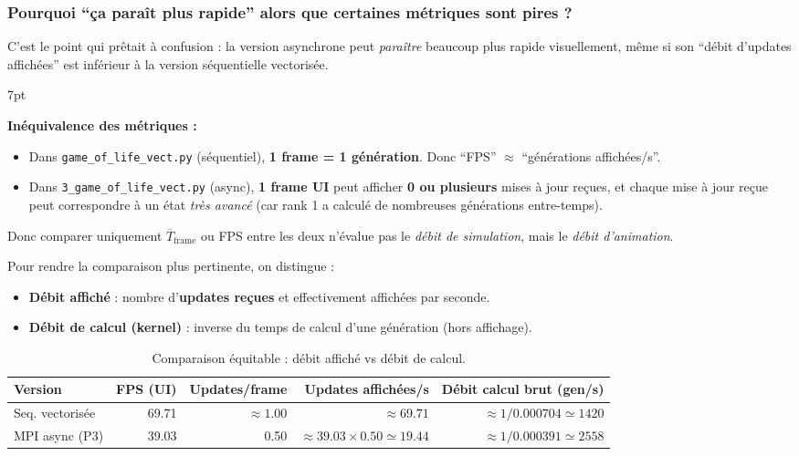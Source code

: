 \documentclass[11pt,a4paper]{article}
\newenvironment{formal}{%
\def\FrameCommand{%
  \hspace{1pt}%
  {\color{enstaBleuFonce}\vrule width 2pt}%
  {\color{formalshade}\vrule width 4pt}%
  \colorbox{formalshade}%
}%
\MakeFramed{\advance\hsize-\width\FrameRestore}%
\noindent\hspace{-4.55pt}%
\begin{adjustwidth}{}{7pt}%
\vspace{4pt}%
}{%
\vspace{4pt}\end{adjustwidth}\endMakeFramed%
}
\begin{document}
\subsubsection{Pourquoi ``ça paraît plus rapide'' alors que certaines métriques sont pires ?}

C’est le point qui prêtait à confusion : la version asynchrone peut \emph{paraître} beaucoup plus rapide visuellement, même si son ``débit d’updates affichées'' est inférieur à la version séquentielle vectorisée.

\begin{formal}
\textbf{Inéquivalence des métriques :}
\begin{itemize}[leftmargin=1.2em]
  \item Dans \texttt{game\_of\_life\_vect.py} (séquentiel), \textbf{1 frame = 1 génération}. Donc ``FPS'' $\approx$ ``générations affichées/s''.
  \item Dans \texttt{3\_game\_of\_life\_vect.py} (async), \textbf{1 frame UI} peut afficher \textbf{0 ou plusieurs} mises à jour reçues, et chaque mise à jour reçue peut correspondre à un état \emph{très avancé} (car rank 1 a calculé de nombreuses générations entre-temps).
\end{itemize}
Donc comparer uniquement $\overline{T}_{\text{frame}}$ ou FPS entre les deux n’évalue pas le \emph{débit de simulation}, mais le \emph{débit d’animation}.
\end{formal}

Pour rendre la comparaison plus pertinente, on distingue :
\begin{itemize}[leftmargin=1.2em]
  \item \textbf{Débit affiché} : nombre d’\textbf{updates reçues} et effectivement affichées par seconde.
  \item \textbf{Débit de calcul (kernel)} : inverse du temps de calcul d’une génération (hors affichage).
\end{itemize}

\begin{table}[H]
  \centering
  \small
  \caption{Comparaison équitable : débit affiché vs débit de calcul.}
  \label{tab:fair-compare}
  \begin{tabular}{@{}lrrrr@{}}
    \toprule
    Version & FPS (UI) & Updates/frame & Updates affichées/s & Débit calcul brut (gen/s) \\
    \midrule
    Seq. vectorisée & 69.71 & $\approx 1.00$ & $\approx 69.71$ & $\approx 1/0.000704 \simeq 1420$ \\
    MPI async (P3) & 39.03 & 0.50 & $\approx 39.03\times 0.50 \simeq 19.44$ & $\approx 1/0.000391 \simeq 2558$ \\
    \bottomrule
  \end{tabular}
\end{table}
\end{document}

